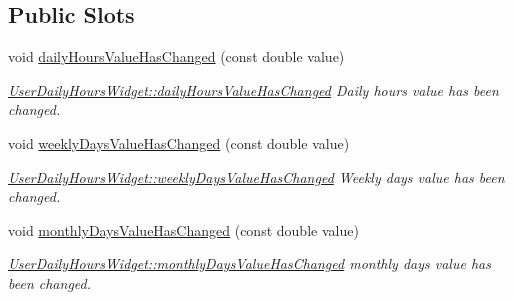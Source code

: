 \subsection*{Public Slots}
\begin{DoxyCompactItemize}
\item 
void \hyperlink{classGui_1_1Widgets_1_1UserDailyHoursWidget_a53e8b7eb038153361efd44c4061c7616}{daily\-Hours\-Value\-Has\-Changed} (const double value)
\begin{DoxyCompactList}\small\item\em \hyperlink{classGui_1_1Widgets_1_1UserDailyHoursWidget_a53e8b7eb038153361efd44c4061c7616}{User\-Daily\-Hours\-Widget\-::daily\-Hours\-Value\-Has\-Changed} Daily hours {\itshape value} has been changed. \end{DoxyCompactList}\item 
void \hyperlink{classGui_1_1Widgets_1_1UserDailyHoursWidget_a1419c5a32c0b786215b3b2b6b348be05}{weekly\-Days\-Value\-Has\-Changed} (const double value)
\begin{DoxyCompactList}\small\item\em \hyperlink{classGui_1_1Widgets_1_1UserDailyHoursWidget_a1419c5a32c0b786215b3b2b6b348be05}{User\-Daily\-Hours\-Widget\-::weekly\-Days\-Value\-Has\-Changed} Weekly days {\itshape value} has been changed. \end{DoxyCompactList}\item 
void \hyperlink{classGui_1_1Widgets_1_1UserDailyHoursWidget_a6c9cc50280109e153f3de4ef76738c85}{monthly\-Days\-Value\-Has\-Changed} (const double value)
\begin{DoxyCompactList}\small\item\em \hyperlink{classGui_1_1Widgets_1_1UserDailyHoursWidget_a6c9cc50280109e153f3de4ef76738c85}{User\-Daily\-Hours\-Widget\-::monthly\-Days\-Value\-Has\-Changed} monthly days {\itshape value} has been changed. \end{DoxyCompactList}\end{DoxyCompactItemize}
